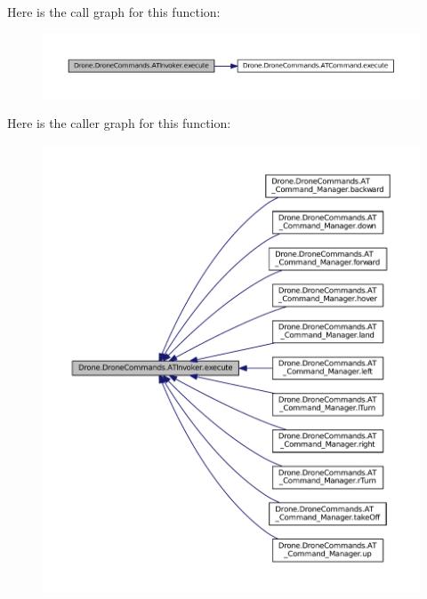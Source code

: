 Here is the call graph for this function\+:\nopagebreak
\begin{figure}[H]
\begin{center}
\leavevmode
\includegraphics[width=350pt]{class_drone_1_1_drone_commands_1_1_a_t_invoker_a0dfcc8b67f8642820b66411954452d06_cgraph}
\end{center}
\end{figure}




Here is the caller graph for this function\+:\nopagebreak
\begin{figure}[H]
\begin{center}
\leavevmode
\includegraphics[width=350pt]{class_drone_1_1_drone_commands_1_1_a_t_invoker_a0dfcc8b67f8642820b66411954452d06_icgraph}
\end{center}
\end{figure}


\hypertarget{class_drone_1_1_drone_commands_1_1_a_t_invoker_af32f17db8eb3a66a6f3d05ec7e00ef0b}{}
